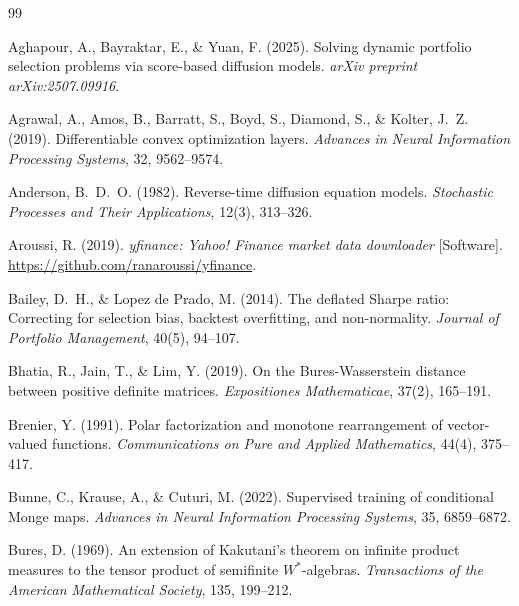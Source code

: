 \documentclass{article}
\begin{document}
\newpage
\begin{thebibliography}{99}

Aghapour, A., Bayraktar, E., \& Yuan, F. (2025).
\newblock Solving dynamic portfolio selection problems via score-based diffusion
  models.
\newblock \emph{arXiv preprint arXiv:2507.09916}.

Agrawal, A., Amos, B., Barratt, S., Boyd, S., Diamond, S., \& Kolter, J.~Z.
(2019).
\newblock Differentiable convex optimization layers.
\newblock \emph{Advances in Neural Information Processing Systems}, 32,
  9562--9574.

Anderson, B.~D.~O. (1982).
\newblock Reverse-time diffusion equation models.
\newblock \emph{Stochastic Processes and Their Applications}, 12(3), 313--326.

Aroussi, R. (2019).
\newblock \emph{yfinance: Yahoo! Finance market data downloader} [Software].
\newblock \url{https://github.com/ranaroussi/yfinance}.

Bailey, D.~H., \& Lopez de Prado, M. (2014).
\newblock The deflated Sharpe ratio: Correcting for selection bias, backtest
  overfitting, and non-normality.
\newblock \emph{Journal of Portfolio Management}, 40(5), 94--107.

Bhatia, R., Jain, T., \& Lim, Y. (2019).
\newblock On the Bures-Wasserstein distance between positive definite matrices.
\newblock \emph{Expositiones Mathematicae}, 37(2), 165--191.

Brenier, Y. (1991).
\newblock Polar factorization and monotone rearrangement of vector-valued
  functions.
\newblock \emph{Communications on Pure and Applied Mathematics}, 44(4),
  375--417.

Bunne, C., Krause, A., \& Cuturi, M. (2022).
\newblock Supervised training of conditional Monge maps.
\newblock \emph{Advances in Neural Information Processing Systems}, 35,
  6859--6872.

Bures, D. (1969).
\newblock An extension of Kakutani's theorem on infinite product measures to
  the tensor product of semifinite $W^*$-algebras.
\newblock \emph{Transactions of the American Mathematical Society}, 135,
  199--212.


\end{thebibliography}
\end{document}
